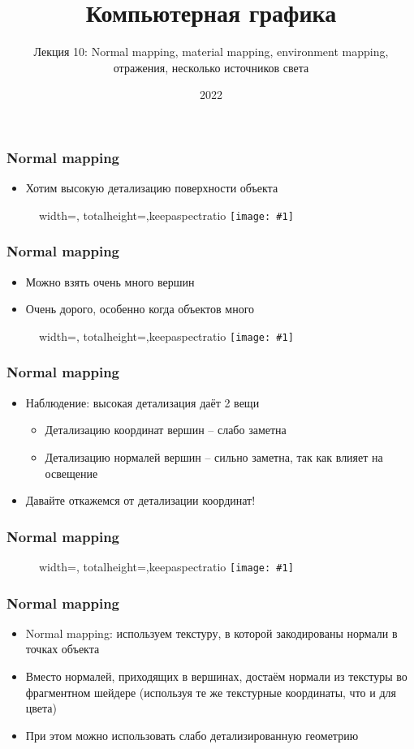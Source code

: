 \documentclass{beamer}
\title{Компьютерная графика}
\subtitle{Лекция 10: Normal mapping, material mapping, environment mapping, отражения, несколько источников света}
\date{2022}
\newcommand{\slideimage}[1]{
  \begin{figure}
    \begin{adjustbox}{width=\textwidth, totalheight=\textheight-2\baselineskip-2\baselineskip,keepaspectratio}
      \texttt{[image: \#1]}
    \end{adjustbox}
  \end{figure}
}
\begin{document}
\frame{\titlepage}

\begin{frame}[fragile]
\frametitle{Normal mapping}
\begin{itemize}
\item Хотим высокую детализацию поверхности объекта
\end{itemize}
\slideimage{orange.png}
\end{frame}

\begin{frame}[fragile]
\frametitle{Normal mapping}
\begin{itemize}
\item Можно взять очень много вершин
\pause
\item Очень дорого, особенно когда объектов много
\end{itemize}
\slideimage{orange-mesh.png}
\end{frame}

\begin{frame}[fragile]
\frametitle{Normal mapping}
\begin{itemize}
\item Наблюдение: высокая детализация даёт 2 вещи
\begin{itemize}
\item Детализацию координат вершин -- слабо заметна
\item Детализацию нормалей вершин -- сильно заметна, так как влияет на освещение
\end{itemize}
\pause
\item Давайте откажемся от детализации координат!
\end{itemize}
\end{frame}

\begin{frame}[fragile]
\frametitle{Normal mapping}
\slideimage{orange-normal-map.png}
\end{frame}

\begin{frame}[fragile]
\frametitle{Normal mapping}
\begin{itemize}
\item Normal mapping: используем текстуру, в которой закодированы нормали в точках объекта
\pause
\item Вместо нормалей, приходящих в вершинах, достаём нормали из текстуры во фрагментном шейдере (используя те же текстурные координаты, что и для цвета)
\pause
\item При этом можно использовать слабо детализированную геометрию
\end{itemize}
\end{frame}
\end{document}
